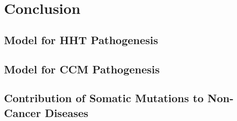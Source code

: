 \chapter{Conclusion}

\section{Model for HHT Pathogenesis}
\section{Model for CCM Pathogenesis}
\section{Contribution of Somatic Mutations to Non-Cancer Diseases}

